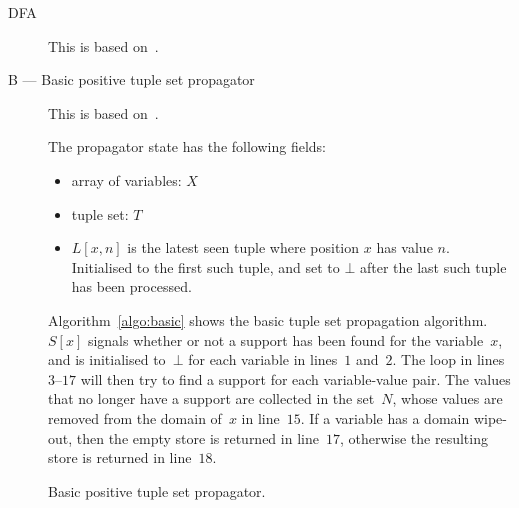 \documentclass[a4paper,11pt]{article}
\theoremstyle{definition}
\newcommand{\Algoref}[1]{Algorithm~\ref{#1}}
\newcommand{\Extensional}{\Constraint{Extensional}~}
\newcommand{\Dom}[1]{\text{dom}({#1})}
\newcommand{\FOREACH}[1]{\FORALL{{#1} \textbf{do}}}
\newcommand{\ENDFOREACH}{\ENDFOR}
\def\PROCEDURE{\item[\textbf{PROCEDURE}]}
\def\Extensional{\textsc{Extensional}}
\numberwithin{equation}{section}
\begin{document}
\begin{description}
  \item[DFA] This is based on~\cite{Pesant:seqs}.
  \item[B --- Basic positive tuple set propagator]
    This is based on~\cite{DBLP:journals/ai/BessiereRYZ05}.

     The propagator state has the following fields:

     \begin{itemize}
     \item array of variables: $X$
     \item tuple set: $T$
     \item $L[x,n]$ is the latest seen tuple where position
       $x$ has value $n$.  Initialised to the first such tuple, and set to
       $\bot$ after the last such tuple has been processed.
     \end{itemize}

     \Algoref{algo:basic} shows the basic tuple set propagation algorithm.
     $S[x]$ signals whether or not a support has been found for the variable~$x$,
     and is initialised to~$\bot$ for each variable in lines~$1$ and~$2$.
     The loop in lines
     $3$--$17$ will then try to find a support for each variable-value pair.
     The values that no longer have a support are collected in
     the set~$N$, whose values are removed from the domain of~$x$ in line~$15$.
     If a variable has a domain wipe-out,
     then the empty store is returned in line~$17$, otherwise the resulting store
     is returned in line~$18$.

     \begin{algorithm}
       \caption{Basic positive tuple set propagator.}
       \label{algo:basic}
     \end{algorithm}
\clearpage


\end{description}
\end{document}
